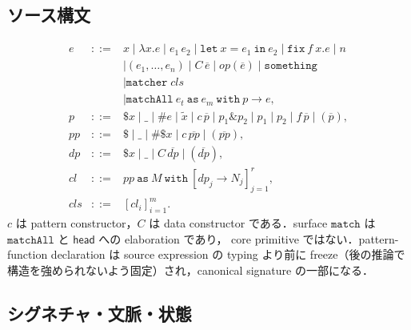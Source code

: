 \subsection{ソース構文}

\[
\begin{array}{rcl}
e &::=& x\mid\lambda x.e\mid e_1\,e_2
  \mid\mathtt{let}\ x=e_1\ \mathtt{in}\ e_2
  \mid\mathtt{fix}\ f\ x.e\mid n\\
&&\mid(e_1,\ldots,e_n)\mid C\,\overline e
  \mid op(\overline e)\mid\mathtt{something}\\
&&\mid\mathtt{matcher}\;\mathit{cls}\\
&&\mid\mathtt{matchAll}\ e_t\ \mathtt{as}\ e_m\
       \mathtt{with}\ p\to e,\\[0.2em]
p &::=& \$x\mid\_\mid\#e\mid\widetilde x
  \mid c\,\overline p\mid p_1\mathbin{\&}p_2
  \mid p_1\mathbin{|}p_2\mid f\,\overline p
  \mid(\overline p),\\
pp &::=& \$\mid\_\mid\#\$x\mid c\,\overline{pp}
  \mid(\overline{pp}),\\
dp &::=& \$x\mid\_\mid C\,\overline{dp}\mid(\overline{dp}),\\
cl &::=& pp\ \mathtt{as}\ M\ \mathtt{with}\
  [dp_j\to N_j]_{j=1}^{r},\\
\mathit{cls} &::=& [cl_i]_{i=1}^{m}.
\end{array}
\]
$c$ は pattern constructor，$C$ は data constructor である．surface
$\mathtt{match}$ は $\mathtt{matchAll}$ と $\mathsf{head}$ への elaboration であり，
core primitive ではない．pattern-function declaration は source expression の typing より前に
freeze（後の推論で構造を強められないよう固定）され，canonical signature の一部になる．

\subsection{シグネチャ・文脈・状態}

